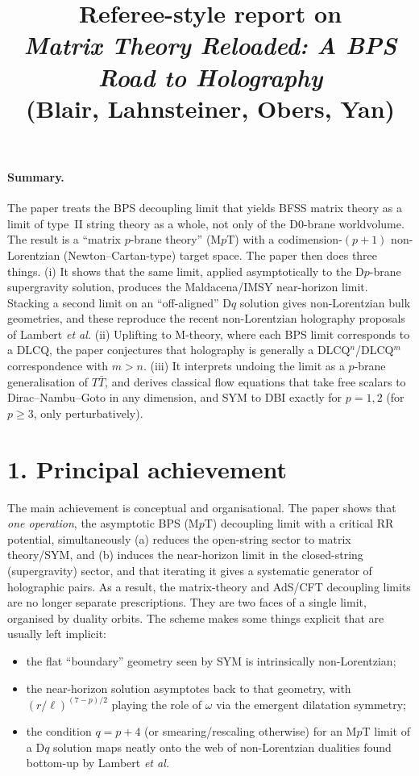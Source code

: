 \documentclass[11pt]{article}
\title{Referee-style report on\\[2pt] \emph{Matrix Theory Reloaded: A BPS Road to Holography}\\[2pt]
\large (Blair, Lahnsteiner, Obers, Yan)}
\date{}
\newcommand{\TT}{$T\bar T$}
\begin{document}
\maketitle
\vspace{-1.5em}

\paragraph{Summary.}
The paper treats the BPS decoupling limit that yields BFSS matrix theory as a limit of type~II string theory as a whole, not only of the D0-brane worldvolume. The result is a ``matrix $p$-brane theory'' (M$p$T) with a codimension-$(p{+}1)$ non-Lorentzian (Newton--Cartan-type) target space. The paper then does three things. (i) It shows that the same limit, applied asymptotically to the D$p$-brane supergravity solution, produces the Maldacena/IMSY near-horizon limit. Stacking a second limit on an ``off-aligned'' D$q$ solution gives non-Lorentzian bulk geometries, and these reproduce the recent non-Lorentzian holography proposals of Lambert \emph{et al.} (ii) Uplifting to M-theory, where each BPS limit corresponds to a DLCQ, the paper conjectures that holography is generally a DLCQ$^n$/DLCQ$^m$ correspondence with $m>n$. (iii) It interprets undoing the limit as a $p$-brane generalisation of \TT, and derives classical flow equations that take free scalars to Dirac--Nambu--Goto in any dimension, and SYM to DBI exactly for $p=1,2$ (for $p\ge 3$, only perturbatively).

\section*{1. Principal achievement}

The main achievement is conceptual and organisational. The paper shows that \emph{one operation}, the asymptotic BPS (M$p$T) decoupling limit with a critical RR potential, simultaneously
(a) reduces the open-string sector to matrix theory/SYM, and
(b) induces the near-horizon limit in the closed-string (supergravity) sector,
and that iterating it gives a systematic generator of holographic pairs. As a result, the matrix-theory and AdS/CFT decoupling limits are no longer separate prescriptions. They are two faces of a single limit, organised by duality orbits. The scheme makes some things explicit that are usually left implicit:
\begin{itemize}
  \item the flat ``boundary'' geometry seen by SYM is intrinsically non-Lorentzian;
  \item the near-horizon solution asymptotes back to that geometry, with $(r/\ell)^{(7-p)/2}$ playing the role of $\omega$ via the emergent dilatation symmetry;
  \item the condition $q=p+4$ (or smearing/rescaling otherwise) for an M$p$T limit of a D$q$ solution maps neatly onto the web of non-Lorentzian dualities found bottom-up by Lambert \emph{et al.}
\end{itemize}
\end{document}
